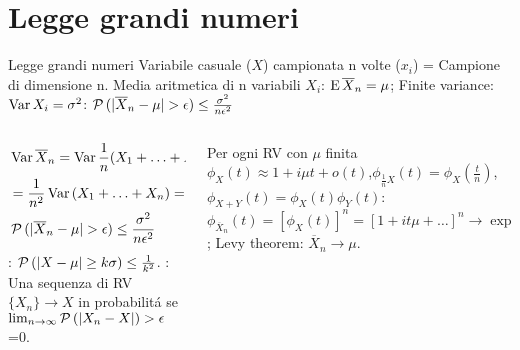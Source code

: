 \section{Legge grandi numeri}

\begin{frame}{Legge grandi numeri}
Variabile casuale ($X$) campionata n volte ($x_i$) = Campione di dimensione n.
    Media aritmetica di n variabili $X_i$: $\operatorname{E}{\overline{X}_n}=\mu$; Finite variance: $\operatorname{Var}{X_i}=\sigma^2$: $\prob{(|\overline{X}_n-\mu|>\epsilon)}\leq\frac{\sigma^2}{n\epsilon^2}$
    \begin{columns}
    \begin{column}{0.5\textwidth}
\begin{align*}
&\var{\overline{X}_n}=\var{\frac{1}{n}(X_1+\ldots+X_n)}\\
&=\frac{1}{n^2}\var{(X_1+\ldots+X_n)}=\frac{n\sigma^2}{n^2}=\frac{\sigma^2}{n}\\
&\prob{(|\overline{X}_n-\mu|>\epsilon)}\leq\frac{\sigma^2}{n\epsilon^2}
\end{align*}
: $\operatorname{\mathcal{P}}{(|X-\mu|\geq k\sigma)}\leq\frac{1}{k^2}$.
: Una sequenza di RV $\{X_n\}\to X$ in probabilit\'a se $\lim_{n\to\infty}\operatorname{\mathcal{P}}{(|X_n-X|)>\epsilon}$=0.
    \end{column}
    \begin{column}{0.5\textwidth}
Per ogni RV con $\mu$ finita $\phi_X(t)\approx1+i\mu t+o(t)$,$\phi_{\frac{1}{n}X}(t)=\phi_X(\frac{t}{n})$, $\phi_{X+Y}(t)=\phi_X(t)\phi_Y(t)$:
$\phi_{\overline{X}_n}(t)=[\phi_X(t)]^n=[1+it\mu+\ldots]^n\to\exp{i\mu t}$; Levy theorem: $\overline{X}_n\to\mu$.
    \end{column}
    \end{columns}
\end{frame}

